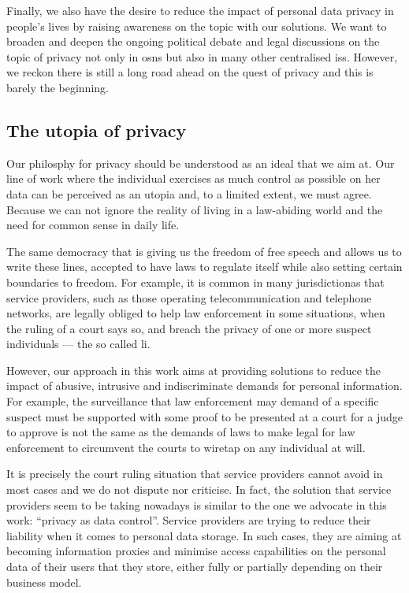 Finally, we also have the desire to reduce the impact of personal data privacy in 
people's lives by raising awareness on the topic with our solutions. We want to 
broaden and deepen the ongoing political debate and legal discussions on the topic 
of privacy not only in \acp{osn} but also in many other centralised \acp{is}. However, 
we reckon there is still a long road ahead on the quest of privacy and this is barely 
the beginning.

\subsection{The utopia of privacy}
    \label{subsection:thesis:utopia-of-privacy}
Our philosphy for privacy should be understood as an ideal that we aim at. Our line 
of work where the individual exercises as much control as possible on her data can 
be perceived as an utopia and, to a limited extent, we must agree. Because we can 
not ignore the reality of living in a law-abiding world and the need for common 
sense in daily life. 

The same democracy that is giving us the freedom of free speech and allows us to 
write these lines, accepted to have laws to regulate itself while also setting certain 
boundaries to freedom. For example, it is common in many jurisdictionas that service 
providers, such as those operating telecommunication and telephone networks, are 
legally obliged to help law enforcement in some situations, when the ruling of a 
court says so, and breach the privacy of one or more suspect individuals --- the 
so called \ac{li}.

However, our approach in this work aims at providing solutions to reduce the impact 
of abusive, intrusive and indiscriminate demands for personal information. For example, 
the surveillance that law enforcement may demand of a specific suspect must be supported 
with some proof to be presented at a court for a judge to approve is not the same 
as the demands of laws to make legal for law enforcement to circumvent the courts 
to wiretap on any individual at will.

It is precisely the court ruling situation that service providers cannot avoid in 
most cases and we do not dispute nor criticise. In fact, the solution that service 
providers seem to be taking nowadays is similar to the one we advocate in this 
work: ``privacy as data control''. Service providers are trying to reduce their 
liability when it comes to personal data storage. In such cases, they are aiming  
at becoming information proxies and minimise access capabilities on the personal 
data of their users that they store, either fully or partially depending on their 
business model.

